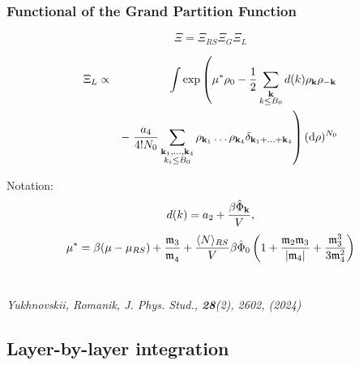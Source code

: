 \documentclass[8pt]{beamer}
\begin{document}
	\begin{frame}
		\frametitle{Functional of the Grand Partition Function}
		
		\begin{equation*}
			\label{Xi_as_prod}
			\Xi = \Xi_{RS}\Xi_G\Xi_L
		\end{equation*}
		
		\begin{eqnarray*}
			\label{Xi_L_1}
			\Xi_L & \propto &
			\int \exp\left(
			\mu^* \rho_0 - \frac{1}{2} \sum_{\substack{\vb k \\ k \leq B_0}} d(k) \rho_{\vb k} \rho_{-\vb k} 
			\right.\\
			&& -\left. \frac{a_4}{4! N_0} \sum_{\substack{\vb k_1, \dotsc, \vb k_4 \\ k_i \leq B_0}} \rho_{\vb k_1} \dotsc \rho_{\vb k_4} \delta_{\vb{k}_1 + \dotsc + \vb{k}_4} \right) ({\rm d} \rho)^{N_0}
			\nonumber
		\end{eqnarray*}
		
		Notation:
		\begin{equation*}
			d(k) = a_2 + \frac{\beta\hat{\Phi}_{\vb k}}{V},
		\end{equation*}
		\begin{equation*}
			\mu^* = \beta(\mu - \mu_{RS}) + \frac{\mathfrak{m}_3}{\mathfrak{m_4}} + 
			\frac{\langle N \rangle_{RS}}{V}\beta\hat{\Phi}_0 
			\left(
			1 + \frac{\mathfrak{m}_2 \mathfrak{m}_3}{\abs{\mathfrak{m}_4}} + \frac{\mathfrak{m}_3^3}{3\mathfrak{m}_4^2}
			\right)
		\end{equation*}
		\hfill
		\\
		\hfill
		
		\textit{Yukhnovskii, Romanik, J. Phys. Stud., {\bf 28}(2), 2602, (2024)}
		
	\end{frame}
	
	\subsection{Layer-by-layer integration}
	
\end{document}
